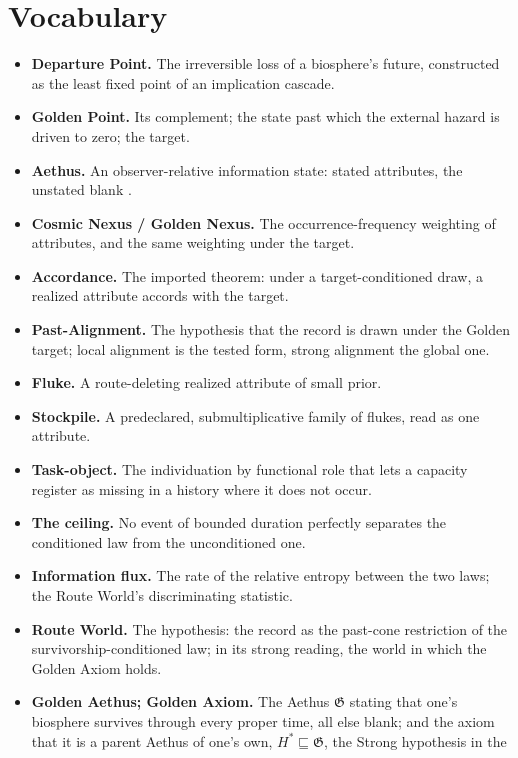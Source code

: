 \section{Vocabulary}\label{sec:vocab}
\begin{itemize}[itemsep=2pt]
\item \textbf{Departure Point.} The irreversible loss of a biosphere's
future, constructed as the least fixed point of an implication cascade.
\item \textbf{Golden Point.} Its complement; the state past which the
external hazard is driven to zero; the target.
\item \textbf{Aethus.} An observer-relative information state: stated
attributes, the unstated blank \cite{Aethus}.
\item \textbf{Cosmic Nexus / Golden Nexus.} The occurrence-frequency
weighting of attributes, and the same weighting under the target.
\item \textbf{Accordance.} The imported theorem: under a target-conditioned
draw, a realized attribute accords with the target.
\item \textbf{Past-Alignment.} The hypothesis that the record is drawn under
the Golden target; local alignment is the tested form, strong alignment
the global one.
\item \textbf{Fluke.} A route-deleting realized attribute of small prior.
\item \textbf{Stockpile.} A predeclared, submultiplicative family of flukes,
read as one attribute.
\item \textbf{Task-object.} The individuation by functional role that lets a
capacity register as missing in a history where it does not occur.
\item \textbf{The ceiling.} No event of bounded duration perfectly separates
the conditioned law from the unconditioned one.
\item \textbf{Information flux.} The rate of the relative entropy between
the two laws; the Route World's discriminating statistic.
\item \textbf{Route World.} The hypothesis: the record as the past-cone
restriction of the survivorship-conditioned law; in its strong reading,
the world in which the Golden Axiom holds.
\item \textbf{Golden Aethus; Golden Axiom.} The Aethus $\mathfrak G$ stating
that one's biosphere survives through every proper time, all else blank;
and the axiom that it is a parent Aethus of one's own,
$H^{\ast}\sqsubseteq\mathfrak G$, the Strong hypothesis in the

\end{itemize}
